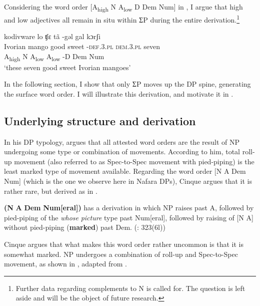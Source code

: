 \documentclass[output=paper]{langscibook}
\begin{document}
Considering the word order [A\textsubscript{high}  N  A\textsubscript{low}  D  Dem  Num] in , I argue that high and low adjectives all remain in situ within ƩP during the entire derivation.\footnote{Further data regarding complements to N is called for. The question is left aside and will be the object of future research.}  


\ea\label{ex:baron:14}
\glll kodivware lo ʧɛ tã -gəl gal kɔrʃi\\
   Ivorian mango good sweet  -\textsc{def.3.pl} \textsc{dem.3.pl} seven\\
   A\textsubscript{high}   N  A\textsubscript{low}  A\textsubscript{low}  -D  Dem  Num\\
\glt ‘these seven good sweet Ivorian mangoes’
\z

In the following section, I show that only ƩP moves up the DP spine, generating the surface word order. I will illustrate this derivation, and motivate it in .

 
\subsection{Underlying structure and derivation} 
\label{sec:baron:2.2}
In his DP typology, \citet{Cinque2005} argues that all attested word orders are the result of NP undergoing some type or combination of movements. According to him, total roll-up movement (also referred to as Spec-to-Spec movement with pied-piping) is the least marked type of movement available. Regarding the word order [N A Dem Num] (which is the one we observe here in Nafara DPs), Cinque argues that it is rather rare, but derived as in .

\ea\label{ex:baron:15}
\textbf{(N} \textbf{A} \textbf{Dem} \textbf{Num[eral])} has a derivation in which NP raises past A, followed by pied-piping of the \textit{whose} \textit{picture} type past Num[eral], followed by raising of [N A] without  pied-piping (\textbf{marked}) past Dem.        (\citealt{Cinque2005}: 323(6l))
\z

Cinque argues that what makes this word order rather uncommon is that it is somewhat marked. NP undergoes a combination of roll-up and Spec-to-Spec movement, as shown in , adapted from \citet{Cinque2005}.
\end{document}
